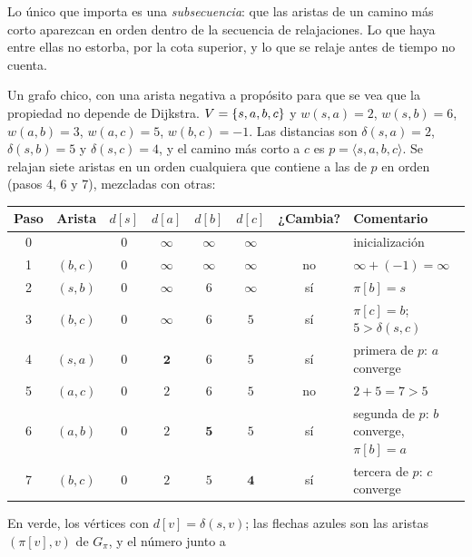 \documentclass[11pt,letterpaper]{article}
\begin{document}
\begin{idea}
  Lo único que importa es una \emph{subsecuencia}: que las aristas de
  un camino más corto aparezcan en orden dentro de la secuencia de
  relajaciones. Lo que haya entre ellas no estorba, por la cota
  superior, y lo que se relaje antes de tiempo no cuenta.
\end{idea}

\begin{ejemplo}
  \label{ej:caminos-relajacion}
  Un grafo chico, con una arista negativa a propósito para que se vea
  que la propiedad no depende de Dijkstra. $V = \left\{ s, a, b, c \right\}$ y
  $w(s, a) = 2$, $w(s, b) = 6$, $w(a, b) = 3$, $w(a, c) = 5$,
  $w(b, c) = -1$. Las distancias son $\delta(s, a) = 2$,
  $\delta(s, b) = 5$ y $\delta(s, c) = 4$, y el camino más corto a $c$
  es $p = \langle s, a, b, c \rangle$. Se relajan siete aristas en un
  orden cualquiera que contiene a las de $p$ en orden (pasos 4, 6
  y 7), mezcladas con otras:
  \begin{center}
  \small
  \begin{tabular}{cccccccl}
    \toprule
    \textbf{Paso} & \textbf{Arista} & $d[s]$ & $d[a]$ & $d[b]$
      & $d[c]$ & \textbf{¿Cambia?} & \textbf{Comentario} \\
    \midrule
    0 & & $0$ & $\infty$ & $\infty$ & $\infty$ & & inicialización \\
    1 & $(b, c)$ & $0$ & $\infty$ & $\infty$ & $\infty$ & no
      & $\infty + (-1) = \infty$ \\
    2 & $(s, b)$ & $0$ & $\infty$ & $6$ & $\infty$ & sí
      & $\pi[b] = s$ \\
    3 & $(b, c)$ & $0$ & $\infty$ & $6$ & $5$ & sí
      & $\pi[c] = b$; $5 > \delta(s, c)$ \\
    4 & $(s, a)$ & $0$ & $\mathbf{2}$ & $6$ & $5$ & sí
      & primera de $p$: $a$ converge \\
    5 & $(a, c)$ & $0$ & $2$ & $6$ & $5$ & no & $2 + 5 = 7 > 5$ \\
    6 & $(a, b)$ & $0$ & $2$ & $\mathbf{5}$ & $5$ & sí
      & segunda de $p$: $b$ converge, $\pi[b] = a$ \\
    7 & $(b, c)$ & $0$ & $2$ & $5$ & $\mathbf{4}$ & sí
      & tercera de $p$: $c$ converge \\
    \bottomrule
  \end{tabular}
  \end{center}
  En verde, los vértices con $d[v] = \delta(s, v)$; las flechas
  azules son las aristas $(\pi[v], v)$ de $G_\pi$, y el número junto a

\end{ejemplo}
\end{document}
